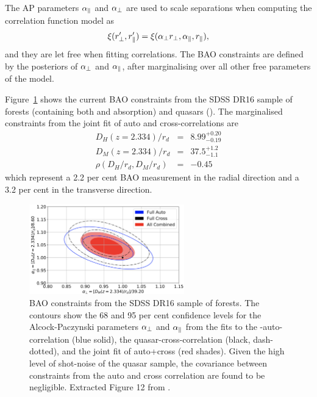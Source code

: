 The AP parameters ${\alpha_\parallel}$ and ${\alpha_\perp}$ are used to scale separations when 
computing the correlation function model as
\begin{equation}
    \xi(r'_\perp, r'_\parallel)  = \xi({\alpha_\perp} {r_\perp}, {\alpha_\parallel}, {r_\parallel}),
\end{equation}
and they are let free when fitting correlations. 
The BAO constraints are defined by the posteriors of ${\alpha_\perp}$ and ${\alpha_\parallel}$, 
after marginalising over all other free parameters of the model. 


Figure~\ref{fig:baolya_dr16} shows the current BAO constraints from the 
SDSS DR16 sample of \lya forests (containing both \lya and \lyb absorption) 
and quasars (\cite{dumasdesbourbouxhelionCompletedSDSSIVExtended2020}). 
The marginalised constraints from the joint fit of 
auto and cross-correlations are 
\begin{eqnarray}
    D_H(z = 2.334)/r_d & = & 8.99^{+0.20}_{-0.19} \\ 
    D_M(z = 2.334)/r_d & = & 37.5^{+1.2}_{-1.1} \\
    \rho( D_H/r_d, D_M/r_d) & = & -0.45 
\end{eqnarray}
which represent a 2.2 per cent BAO measurement in the radial direction 
and a 3.2 per cent in the transverse direction. 


\begin{figure}[t]
\centering 
\includegraphics[width=0.6\textwidth]{fig/forests/baolya_dr16.png}
\caption{BAO constraints from the SDSS DR16 sample of \lya forests. 
The contours show the 68 and 95 per cent confidence levels for the 
Alcock-Paczynski parameters ${\alpha_\perp}$ and ${\alpha_\parallel}$ from the fits to 
the \lya-\lya auto-correlation (blue solid), 
the quasar-\lya cross-correlation (black, dash-dotted), and the  
joint fit of auto+cross (red shades).
Given the high level of shot-noise of the quasar sample, the 
covariance between constraints from the auto and cross correlation are found to be 
negligible.
Extracted Figure 12 from \cite{dumasdesbourbouxhelionCompletedSDSSIVExtended2020}.}
\label{fig:baolya_dr16}
\end{figure}




